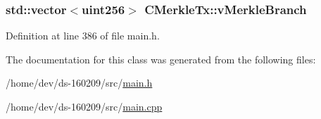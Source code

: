 \subsubsection[{v\+Merkle\+Branch}]{\setlength{\rightskip}{0pt plus 5cm}std\+::vector$<${\bf uint256}$>$ C\+Merkle\+Tx\+::v\+Merkle\+Branch}\label{class_c_merkle_tx_a9ae6a408be914f486ebbb4161879ee69}


Definition at line 386 of file main.\+h.



The documentation for this class was generated from the following files\+:\begin{DoxyCompactItemize}
\item 
/home/dev/ds-\/160209/src/\hyperlink{main_8h}{main.\+h}\item 
/home/dev/ds-\/160209/src/\hyperlink{main_8cpp}{main.\+cpp}\end{DoxyCompactItemize}
